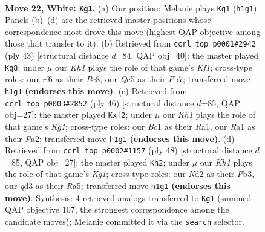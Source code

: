 \documentclass[11pt]{article}
\begin{document}
\clearpage

\begin{figure}[p]\centering
\begin{subfigure}{0.46\textwidth}\centering
\resizebox{\linewidth}{!}{%
\newchessgame
\chessboard[
  setfen={5rk1/1bp2p2/5rp1/pB2Q2p/2P4P/3q4/PP1N2P1/R1B4K w - - 1 22},
  showmover=false,
  pgfstyle=straightmove, color=movearrow, markmove={h1-g1}
]}
\caption{}
\end{subfigure}\hfill
\begin{subfigure}{0.46\textwidth}\centering
\resizebox{\linewidth}{!}{%
\newchessgame
\chessboard[
  setfen={1rb2k2/1p3p1p/p2p1Qp1/2q5/P1P5/6P1/R3PPBP/5K2 b - - 2 22},
  showmover=false,
  pgfstyle=straightmove, color=movearrow, markmove={f8-g8}
]}
\caption{}
\end{subfigure}
\\[4pt]
\begin{subfigure}{0.46\textwidth}\centering
\resizebox{\linewidth}{!}{%
\newchessgame
\chessboard[
  setfen={2rr2k1/pp3ppp/7q/8/1b1N4/1Q2P1PP/PP3nB1/R1B3K1 w - - 0 24},
  showmover=false,
  pgfstyle=straightmove, color=movearrow, markmove={g1-f2}
]}
\caption{}
\end{subfigure}\hfill
\begin{subfigure}{0.46\textwidth}\centering
\resizebox{\linewidth}{!}{%
\newchessgame
\chessboard[
  setfen={1r3rk1/5p1p/3pb1p1/Rp4q1/3QP3/1P5P/5PP1/1R3BK1 w - - 2 25},
  showmover=false,
  pgfstyle=straightmove, color=movearrow, markmove={g1-h2}
]}
\caption{}
\end{subfigure}
\caption{\textbf{Move 22, White: \texttt{Kg1}.} (a) Our position; Melanie plays \texttt{Kg1} (\texttt{h1g1}). Panels (b)--(d) are the retrieved master positions whose correspondence most drove this move (highest QAP objective among those that transfer to it). (b) Retrieved from \texttt{ccrl\_top\_p0001\#2942} (ply 43) [structural distance $d$=84, QAP obj=40]: the master played \texttt{Kg8}; under $\mu$ our \emph{Kh1} plays the role of that game's \emph{Kf1}; cross-type roles: our \emph{r}f6 as their \emph{B}c8, our \emph{Q}e5 as their \emph{P}b7; transferred move \texttt{h1g1} \textbf{(endorses this move)}. (c) Retrieved from \texttt{ccrl\_top\_p0003\#2852} (ply 46) [structural distance $d$=85, QAP obj=27]: the master played \texttt{Kxf2}; under $\mu$ our \emph{Kh1} plays the role of that game's \emph{Kg1}; cross-type roles: our \emph{B}c1 as their \emph{R}a1, our \emph{R}a1 as their \emph{P}a2; transferred move \texttt{h1g1} \textbf{(endorses this move)}. (d) Retrieved from \texttt{ccrl\_top\_p0002\#1157} (ply 48) [structural distance $d$=85, QAP obj=27]: the master played \texttt{Kh2}; under $\mu$ our \emph{Kh1} plays the role of that game's \emph{Kg1}; cross-type roles: our \emph{N}d2 as their \emph{P}b3, our \emph{q}d3 as their \emph{R}a5; transferred move \texttt{h1g1} \textbf{(endorses this move)}. Synthesis: 4 retrieved analogs transferred to \texttt{Kg1} (summed QAP objective 107, the strongest correspondence among the candidate moves); Melanie committed it via the \texttt{search} selector.}
\label{fig:thought-m42}
\end{figure}
\end{document}
